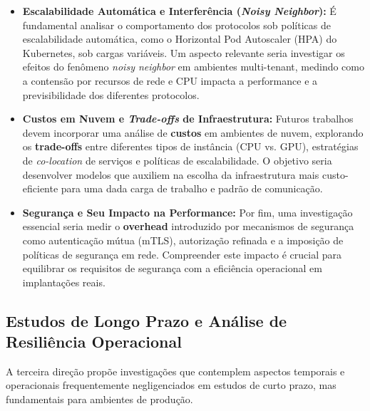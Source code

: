 \begin{itemize}
    \item \textbf{Escalabilidade Automática e Interferência (\textit{Noisy Neighbor}):} É fundamental analisar o comportamento dos protocolos sob políticas de escalabilidade automática, como o Horizontal Pod Autoscaler (HPA) do Kubernetes, sob cargas variáveis. Um aspecto relevante seria investigar os efeitos do fenômeno \textit{noisy neighbor} em ambientes multi-tenant, medindo como a contensão por recursos de rede e CPU impacta a performance e a previsibilidade dos diferentes protocolos.
    
    \item \textbf{Custos em Nuvem e \textit{Trade-offs} de Infraestrutura:} Futuros trabalhos devem incorporar uma análise de \textbf{custos} em ambientes de nuvem, explorando os \textbf{trade-offs} entre diferentes tipos de instância (CPU vs. GPU), estratégias de \textit{co-location} de serviços e políticas de escalabilidade. O objetivo seria desenvolver modelos que auxiliem na escolha da infraestrutura mais custo-eficiente para uma dada carga de trabalho e padrão de comunicação.
    
    \item \textbf{Segurança e Seu Impacto na Performance:} Por fim, uma investigação essencial seria medir o \textbf{overhead} introduzido por mecanismos de segurança como autenticação mútua (mTLS), autorização refinada e a imposição de políticas de segurança em rede. Compreender este impacto é crucial para equilibrar os requisitos de segurança com a eficiência operacional em implantações reais.
\end{itemize}

\subsection{Estudos de Longo Prazo e Análise de Resiliência Operacional}

A terceira direção propõe investigações que contemplem aspectos temporais e operacionais frequentemente negligenciados em estudos de curto prazo, mas fundamentais para ambientes de produção.

